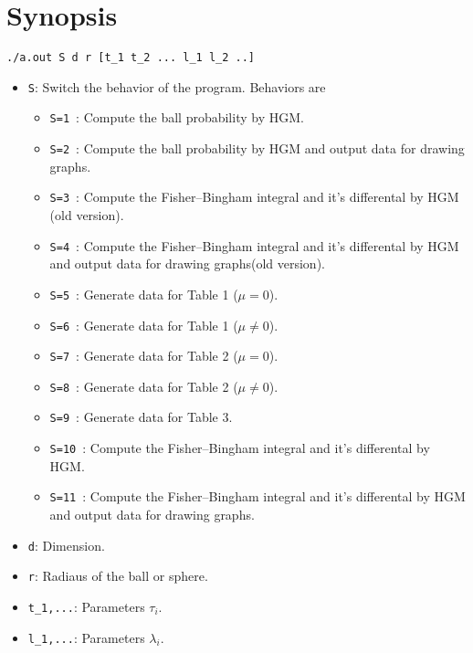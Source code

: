 \documentclass{article}
\begin{document}
\section{Synopsis}
\begin{verbatim}
./a.out S d r [t_1 t_2 ... l_1 l_2 ..]
\end{verbatim}
\begin{itemize}
\item \verb+S+\/: Switch the behavior of the program. Behaviors are
  \begin{itemize}
    \item \verb+S=1+\ : %
    Compute the ball probability by HGM.
    \item \verb+S=2+\ : %
    Compute the ball probability by HGM and output data for drawing graphs.
    \item \verb+S=3+\ : %
    Compute the Fisher--Bingham integral and it's differental by HGM
    (old version).
    \item \verb+S=4+\ : %
    Compute the Fisher--Bingham integral and it's differental by HGM
    and output data for drawing graphs(old version).
    \item \verb+S=5+\ : %
    Generate data for Table 1 ($\mu=0$).
    \item \verb+S=6+\ : %
    Generate data for Table 1 ($\mu\neq 0$).
    \item \verb+S=7+\ : %
    Generate data for Table 2 ($\mu=0$).
    \item \verb+S=8+\ : %
    Generate data for Table 2 ($\mu\neq 0$).
    \item \verb+S=9+\ : %
    Generate data for Table 3.
    \item \verb+S=10+\ : %
    Compute the Fisher--Bingham integral and it's differental by HGM.
    \item \verb+S=11+\ : %
    Compute the Fisher--Bingham integral and it's differental by HGM
    and output data for drawing graphs.
  \end{itemize}
\item \verb+d+\/: Dimension.
\item \verb+r+\/: Radiaus of the ball or sphere.
\item \verb+t_1,...+\/: Parameters $\tau_i$.
\item \verb+l_1,...+\/: Parameters $\lambda_i$.
\end{itemize}
\end{document}
